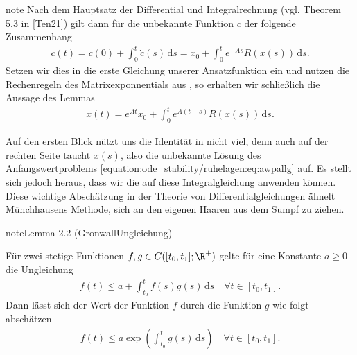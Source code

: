 \documentclass[letterpaper,10pt,english]{jupyterBook}
\begin{document}
\begin{sphinxadmonition}{note}
\sphinxAtStartPar
Nach dem Hauptsatz der Differential\sphinxhyphen{} und Integralrechnung (vgl. Theorem 5.3 in {[}\hyperlink{cite.references:id12}{Ten21}{]}) gilt dann für die unbekannte Funktion \(c\) der folgende Zusammenhang
\begin{equation*}
\begin{split}c(t) = c(0) + \int_0^t \dot{c}(s)\, \mathrm{d}s = x_0+ \int_0^t e^{-As}R(x(s)) \, \mathrm{d}s.\end{split}
\end{equation*}
\sphinxAtStartPar
Setzen wir dies in die erste Gleichung unserer Ansatzfunktion ein und nutzen die Rechenregeln des Matrixexponnentials aus {\hyperref[\detokenize{ode/repetition:rem:matrixexponential_regeln}]{}}, so erhalten wir schließlich die Aussage des Lemmas
\begin{equation*}
\begin{split}x(t) = e^{At}x_0+ \int_0^t e^{A(t-s)}R(x(s)) \, \mathrm{d}s.\end{split}
\end{equation*}\end{sphinxadmonition}

\sphinxAtStartPar
Auf den ersten Blick nützt uns die Identität in {\hyperref[\detokenize{ode_stability/ruhelagen:lem:intexpglgn}]{}} nicht viel, denn auch auf der rechten Seite taucht \(x(s)\), also die unbekannte Lösung des Anfangswertproblems \eqref{equation:ode_stability/ruhelagen:eq:awpallg} auf.
Es stellt sich jedoch heraus, dass wir die  auf diese Integralgleichung anwenden können.
Diese wichtige Abschätzung in der Theorie von Differentialgleichungen ähnelt Münchhausens Methode, sich an den eigenen Haaren aus dem Sumpf zu ziehen.
\label{ode_stability/ruhelagen:lemma:Gronwall}
\begin{sphinxadmonition}{note}{Lemma 2.2 (Gronwall\sphinxhyphen{}Ungleichung)}



\sphinxAtStartPar
Für zwei stetige Funktionen \(f,g\in C([t_0,t_1]; \R^+)\) gelte für eine Konstante \(a \geq 0\) die Ungleichung
\begin{equation*}
\begin{split}f(t) \leq a + \int_{t_0}^t f(s)g(s)\, \mathrm{d}s \quad \forall t\in [t_0,t_1].\end{split}
\end{equation*}
\sphinxAtStartPar
Dann lässt sich der Wert der Funktion \(f\) durch die Funktion \(g\) wie folgt abschätzen
\begin{equation*}
\begin{split}f(t) \leq a \exp{ \left(\int_{t_0}^t g(s)\, \mathrm{d}s \right)} \quad \forall t\in [t_0,t_1].\end{split}
\end{equation*}\end{sphinxadmonition}
\end{document}

